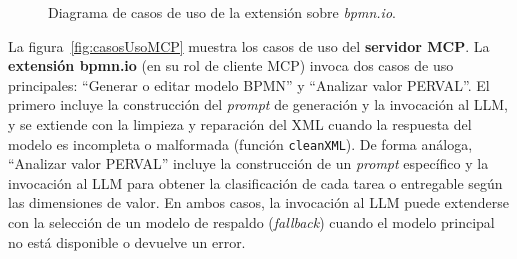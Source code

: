 {\begin{figure}[h!]
{}
\caption{Diagrama de casos de uso de la extensión sobre \textit{bpmn.io}.}
\label{fig:casosUsoExtension}
\end{figure}

La figura~\ref{fig:casosUsoMCP} muestra los casos de uso del \textbf{servidor MCP}. La \textbf{extensión bpmn.io} (en su rol de cliente MCP) invoca dos casos de uso principales: ``Generar o editar modelo BPMN'' y ``Analizar valor PERVAL''. El primero incluye la construcción del \textit{prompt} de generación y la invocación al LLM, y se extiende con la limpieza y reparación del XML cuando la respuesta del modelo es incompleta o malformada (función \texttt{cleanXML}). De forma análoga, ``Analizar valor PERVAL'' incluye la construcción de un \textit{prompt} específico y la invocación al LLM para obtener la clasificación de cada tarea o entregable según las dimensiones de valor. En ambos casos, la invocación al LLM puede extenderse con la selección de un modelo de respaldo (\textit{fallback}) cuando el modelo principal no está disponible o devuelve un error.


\begin{figure}[h!]
\centering
{}
\end{figure}}
